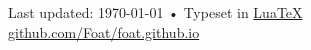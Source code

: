 \documentclass[10pt, a4paper]{article}
\begin{document}
\renewcommand{\refname}{\section*{Publications}\subsection*{Unpublished works}}



\vfill{}

\begin{center}
{\scriptsize  Last updated: \today\- •\- 
Typeset in \href{http://nitens.org/taraborelli/cvtex}{
Lua\TeX}\\
\href{https://github.com/Foat/foat.github.io}{github.com/Foat/foat.github.io}}
\end{center}
\end{document}
